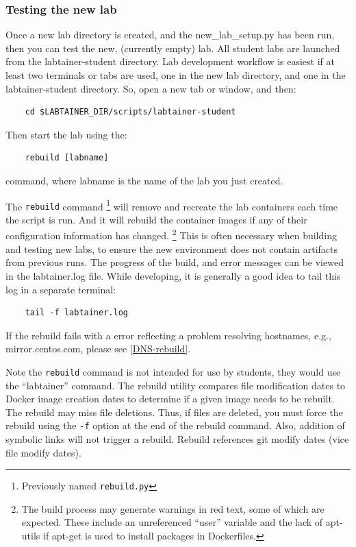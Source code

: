 \documentclass[12pt]{article}
\begin{document}
\subsubsection{Testing the new lab}
Once a new lab directory is created, and the new\_lab\_setup.py has been run, then 
you can test the new, (currently empty) lab.  All student labs are launched from the
labtainer-student directory.  Lab development workflow is easiest if at least two
terminals or tabs are used, one in the new lab directory, and one in the labtainer-student
directory.  So, open a new tab or window, and then:

\begin{verbatim}
    cd $LABTAINER_DIR/scripts/labtainer-student
\end{verbatim}
Then start the lab using the:

\begin{verbatim}
    rebuild [labname] 
\end{verbatim}
command, where labname is the name of the lab you just created.  

The {\tt rebuild} command \footnote{Previously named {\tt rebuild.py}} will remove and recreate the lab containers
each time the script is run.  And it will rebuild the container images if any of their configuration 
information has changed.  \footnote{The build process may generate warnings in red text, some of which are expected.  
These include an unreferenced ``user'' variable and the lack of apt-utils if apt-get is used to install packages in 
Dockerfiles.}  This is often necessary when building and testing new labs, to ensure the
new environment does not contain artifacts from previous runs.
The progress of the build, and error messages can be viewed in 
the labtainer.log file.  While developing, it is generally a good idea to tail this log in
a separate terminal:
\begin{verbatim}
    tail -f labtainer.log
\end{verbatim}
If the rebuild fails with a error reflecting a problem resolving hostnames, e.g., mirror.centos.com, please see \ref{DNS-rebuild}.

Note the {\tt rebuild} command is not intended for use by students, they would use the ``labtainer'' command.  
The rebuild utility compares file modification dates to Docker image creation dates to determine if
a given image needs to be rebuilt.  The rebuild may miss file deletions.  Thus, if files are deleted, you must
force the rebuild using the {\tt -f} option at the end of the rebuild command. Also, addition of symbolic links will not
trigger a rebuild.  Rebuild references git modify dates (vice file modify dates).
\end{document}
